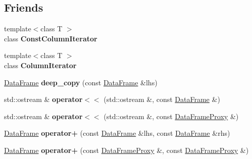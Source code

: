 \subsection*{Friends}
\begin{DoxyCompactItemize}
\item 
\mbox{\label{classDataFrame_a323c4435dd5a1b8a480b46dd8f16c77c}} 
{\footnotesize template$<$class T $>$ }\\class {\bfseries Const\+Column\+Iterator}
\item 
\mbox{\label{classDataFrame_a59406b6236833847c91e20e36a3983c9}} 
{\footnotesize template$<$class T $>$ }\\class {\bfseries Column\+Iterator}
\item 
\mbox{\label{classDataFrame_ac665e1df1c1d41e0d0c5afcdfb827a74}} 
\hyperlink{classDataFrame}{Data\+Frame} {\bfseries deep\+\_\+copy} (const \hyperlink{classDataFrame}{Data\+Frame} \&lhs)
\item 
\mbox{\label{classDataFrame_a7372e1909f73624de2939188c8b407bd}} 
std\+::ostream \& {\bfseries operator$<$$<$} (std\+::ostream \&, const \hyperlink{classDataFrame}{Data\+Frame} \&)
\item 
\mbox{\label{classDataFrame_a178f043594e713eaa0bc4c427cfa7fcd}} 
std\+::ostream \& {\bfseries operator$<$$<$} (std\+::ostream \&, const \hyperlink{classDataFrame_1_1DataFrameProxy}{Data\+Frame\+Proxy} \&)
\item 
\mbox{\label{classDataFrame_a1b618c630383343b0476d4b2ee3892ba}} 
\hyperlink{classDataFrame}{Data\+Frame} {\bfseries operator+} (const \hyperlink{classDataFrame}{Data\+Frame} \&lhs, const \hyperlink{classDataFrame}{Data\+Frame} \&rhs)
\item 
\mbox{\label{classDataFrame_ac7252ac5b8145feb97ce0b16040cdbde}} 
\hyperlink{classDataFrame}{Data\+Frame} {\bfseries operator+} (const \hyperlink{classDataFrame_1_1DataFrameProxy}{Data\+Frame\+Proxy} \&, const \hyperlink{classDataFrame_1_1DataFrameProxy}{Data\+Frame\+Proxy} \&)
\item 
\mbox{\label{classDataFrame_a32fc0676af70bd35bf83e11c9ab946fc}} 

\end{DoxyCompactItemize}
